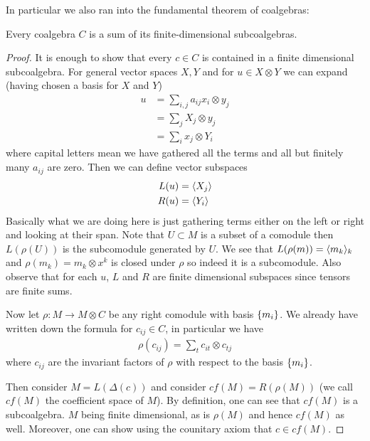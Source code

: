 \documentclass[12pt]{article}
\begin{document}
In particular we also ran into the fundamental theorem of coalgebras: \begin{theorem}
    Every coalgebra $C$ is a sum of its finite-dimensional subcoalgebras.
\end{theorem}
\begin{proof}
    It is enough to show that every $c\in C$ is contained in a finite dimensional subcoalgebra. For general vector spaces $X,Y$ and for $u\in X\otimes Y$ we can expand (having chosen a basis for $X$ and $Y$) \begin{align*}
        u &= \sum_{i,j} a_{ij} x_{i}\otimes y_{j} \\
        &= \sum_{j} X_j \otimes y_j \\
        &= \sum_i x_j\otimes Y_i
    \end{align*} where capital letters mean we have gathered all the terms and all but finitely many $a_{ij}$ are zero. Then we can define vector subspaces \begin{align*}
        L(u) &= \langle{X_j}\rangle \\
        R(u) &= \langle{Y_i}\rangle 
    \end{align*} Basically what we are doing here is just gathering terms either on the left or right and looking at their span. Note that $U\subset M$ is a subset of a comodule then $L(\rho(U))$ is the subcomodule generated by $U$.  We see that $L(\rho(m)) = \langle{m_k}\rangle_k$ and $\rho(m_k) = m_k\otimes x^k$ is closed under $\rho$ so indeed it is a subcomodule. Also observe that for each $u$, $L$ and $R$ are finite dimensional subspaces since tensors are finite sums. 
    
    \hfill
    
    Now let $\rho:M\to M\otimes C$ be any right comodule with basis $\{m_i\}$. We already have written down the formula for $c_{ij}\in C$, in particular we have \begin{align*}
        \rho(c_{ij}) = \sum_{t}c_{it}\otimes c_{tj}
    \end{align*} where $c_{ij}$ are the invariant factors of $\rho$ with respect to the basis $\{m_i\}$. 
    
    \hfill
    
    Then consider $M = L(\Delta(c))$ and consider $cf(M) = R(\rho(M))$ (we call $cf(M)$ the coefficient space of $M$). By definition, one can see that $cf(M)$ is a subcoalgebra. $M$ being finite dimensional, as is $\rho(M)$ and hence $cf(M)$ as well. Moreover, one can show using the counitary axiom that $c\in cf(M)$.
\end{proof}
\end{document}

